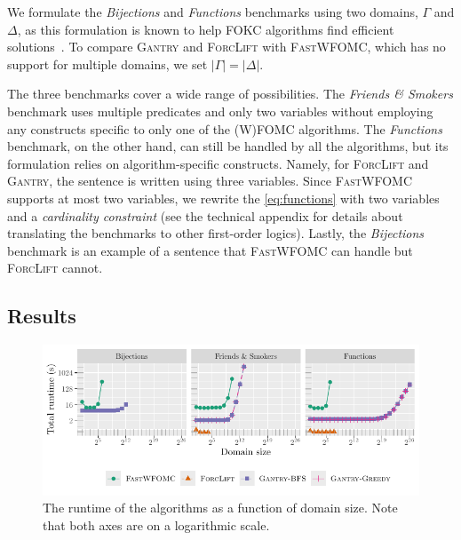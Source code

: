 \documentclass[a4paper,UKenglish,cleveref,autoref,thm-restate]{lipics-v2021}
\newcommand{\Cranetwo}{\textsc{Gantry}}
\newcommand{\friends}{\emph{Friends \& Smokers}}
\newcommand{\functions}{\emph{Functions}}
\newcommand{\bijections}{\emph{Bijections}}
\begin{document}
\begin{remark*}
  We formulate the \bijections{} and \functions{} benchmarks using two domains,
  $\Gamma$ and $\Delta$, as this formulation is known to help FOKC algorithms
  find efficient solutions~\cite{DBLP:conf/kr/DilkasB23}. To compare \Cranetwo{}
  and \textsc{ForcLift} with \textsc{FastWFOMC}, which has no support for
  multiple domains, we set $|\Gamma| = |\Delta|$.
\end{remark*}

The three benchmarks cover a wide range of possibilities. The \friends{}
benchmark uses multiple predicates and only two variables without employing any
constructs specific to only one of the (W)FOMC algorithms. The \functions{}
benchmark, on the other hand, can still be handled by all the algorithms, but
its formulation relies on algorithm-specific constructs. Namely, for
\textsc{ForcLift} and \Cranetwo{}, the sentence is written using three
variables. Since \textsc{FastWFOMC} supports at most two variables, we rewrite
the \cref{eq:functions} with two variables and a \emph{cardinality constraint}
(see the technical appendix for details about translating the benchmarks to
other first-order logics). Lastly, the \bijections{} benchmark is an example of
a sentence that \textsc{FastWFOMC} can handle but \textsc{ForcLift} cannot.

\subsection{Results}

\begin{figure}[t]
  \centering
  \includegraphics{plot.pdf}
  \caption{The runtime of the algorithms as a function of domain size. Note that
    both axes are on a logarithmic scale.}\label{fig:plot}
\end{figure}
\end{document}
